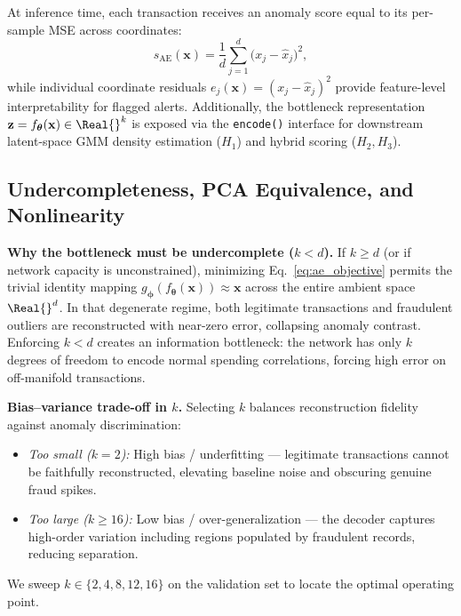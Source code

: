 At inference time, each transaction receives an anomaly score equal to its
per-sample MSE across coordinates:
\begin{equation}
    s_{\text{AE}}(\mathbf{x}) = \frac{1}{d} \sum_{j=1}^{d} \bigl(x_j - \hat{x}_j\bigr)^2,
    \label{eq:ae_score}
\end{equation}
while individual coordinate residuals $e_j(\mathbf{x}) = (x_j - \hat{x}_j)^2$
provide feature-level interpretability for flagged alerts.  Additionally, the
bottleneck representation $\mathbf{z} = f_{\boldsymbol{\theta}}(\mathbf{x}) \in
\Real{}^{k}$ is exposed via the \texttt{encode()} interface for downstream
latent-space GMM density estimation ($H_1$) and hybrid scoring ($H_2, H_3$).

\subsection{Undercompleteness, PCA Equivalence, and Nonlinearity}
\label{sec:ae_pca_theory}

\textbf{Why the bottleneck must be undercomplete ($k < d$).}
If $k \ge d$ (or if network capacity is unconstrained), minimizing
Eq.~\eqref{eq:ae_objective} permits the trivial identity mapping
$g_{\boldsymbol{\phi}}(f_{\boldsymbol{\theta}}(\mathbf{x})) \approx \mathbf{x}$
across the entire ambient space $\Real{}^d$.  In that degenerate regime,
both legitimate transactions and fraudulent outliers are reconstructed with
near-zero error, collapsing anomaly contrast.  Enforcing $k < d$ creates an
information bottleneck: the network has only $k$ degrees of freedom to encode
normal spending correlations, forcing high error on off-manifold transactions.

\textbf{Bias--variance trade-off in $k$.}
Selecting $k$ balances reconstruction fidelity against anomaly discrimination:
\begin{itemize}
    \item \emph{Too small ($k = 2$):} High bias / underfitting --- legitimate
          transactions cannot be faithfully reconstructed, elevating baseline
          noise and obscuring genuine fraud spikes.
    \item \emph{Too large ($k \ge 16$):} Low bias / over-generalization --- the
          decoder captures high-order variation including regions populated by
          fraudulent records, reducing separation.
\end{itemize}
We sweep $k \in \{2, 4, 8, 12, 16\}$ on the validation set to locate the
optimal operating point.


